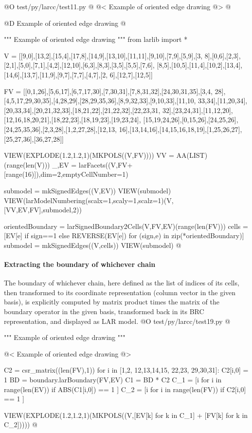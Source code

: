 \documentclass[11pt,oneside]{article}    %
\begin{document}
@O test/py/larcc/test11.py
@{
@< Example of oriented edge drawing @>
@}

@D Example of oriented edge drawing
@{""" Example of oriented edge drawing """
from larlib import *

V = [[9,0],[13,2],[15,4],[17,8],[14,9],[13,10],[11,11],[9,10],[7,9],[5,9],[3,
8],[0,6],[2,3],[2,1],[5,0],[7,1],[4,2],[12,10],[6,3],[8,3],[3,5],[5,5],[7,6],
[8,5],[10,5],[11,4],[10,2],[13,4],[14,6],[13,7],[11,9],[9,7],[7,7],[4,7],[2,
6],[12,7],[12,5]]

FV = [[0,1,26],[5,6,17],[6,7,17,30],[7,30,31],[7,8,31,32],[24,30,31,35],[3,4,
28],[4,5,17,29,30,35],[4,28,29],[28,29,35,36],[8,9,32,33],[9,10,33],[11,10,
33,34],[11,20,34],[20,33,34],[20,21,32,33],[18,21,22],[21,22,32],[22,23,31,
32],[23,24,31],[11,12,20],[12,16,18,20,21],[18,22,23],[18,19,23],[19,23,24],
[15,19,24,26],[0,15,26],[24,25,26],[24,25,35,36],[2,3,28],[1,2,27,28],[12,13,
16],[13,14,16],[14,15,16,18,19],[1,25,26,27],[25,27,36],[36,27,28]]

VIEW(EXPLODE(1.2,1.2,1)(MKPOLS((V,FV))))
VV = AA(LIST)(range(len(V)))
_,EV = larFacets((V,FV+[range(16)]),dim=2,emptyCellNumber=1)

submodel = mkSignedEdges((V,EV))
VIEW(submodel)
VIEW(larModelNumbering(scalx=1,scaly=1,scalz=1)(V,[VV,EV,FV],submodel,2))

orientedBoundary = larSignedBoundary2Cells(V,FV,EV)(range(len(FV)))
cells = [EV[e] if sign==1 else REVERSE(EV[e]) for (sign,e) in zip(*orientedBoundary)]
submodel = mkSignedEdges((V,cells))
VIEW(submodel)
@}


\paragraph{Extracting the boundary of whichever chain}

The boundary of whichever chain, here defined as the list of indices of its cells, then transformed to its coordinate representation (column vector in the given basis), is explicitly computed by matrix product times the matrix of the boundary operator in the given basis, transformed back in its BRC representation, and displayed as  LAR model.
@O test/py/larcc/test19.py
@{""" Example of oriented edge drawing """

@< Example of oriented edge drawing @>

C2 = csr_matrix((len(FV),1))
for i in [1,2, 12,13,14,15, 22,23, 29,30,31]: C2[i,0] = 1
BD = boundary.larBoundary(FV,EV)
C1 = BD * C2
C_1 = [i for i in range(len(EV)) if ABS(C1[i,0]) == 1 ]
C_2 = [i for i in range(len(FV)) if C2[i,0] == 1 ]

VIEW(EXPLODE(1.2,1.2,1)(MKPOLS((V,[EV[k] for k in C_1] + [FV[k] for k in C_2]))))
@}
\end{document}
